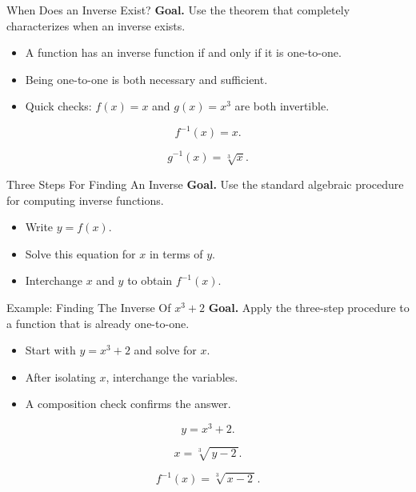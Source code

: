 \documentclass[aspectratio=169]{beamer}
\begin{document}
\begin{frame}[t]{When Does an Inverse Exist?}
\textbf{Goal.} Use the theorem that completely characterizes when an inverse exists.

\begin{itemize}
  \item A function has an inverse function if and only if it is one-to-one.
  \item Being one-to-one is both necessary and sufficient.
  \item Quick checks: \(f(x)=x\) and \(g(x)=x^3\) are both invertible.
\end{itemize}

\[
    f^{-1}(x)=x.
    \]

\[
    g^{-1}(x)=\sqrt[3]{x}.
    \]
\end{frame}

\begin{frame}[t]{Three Steps For Finding An Inverse}
\textbf{Goal.} Use the standard algebraic procedure for computing inverse functions.

\begin{itemize}
  \item Write \(y=f(x)\).
  \item Solve this equation for \(x\) in terms of \(y\).
  \item Interchange \(x\) and \(y\) to obtain \(f^{-1}(x)\).
\end{itemize}
\end{frame}

\begin{frame}[t]{Example: Finding The Inverse Of \(x^3+2\)}
\textbf{Goal.} Apply the three-step procedure to a function that is already one-to-one.

\begin{itemize}
  \item Start with \(y=x^3+2\) and solve for \(x\).
  \item After isolating \(x\), interchange the variables.
  \item A composition check confirms the answer.
\end{itemize}

\[
y=x^3+2.
\]

\[
x=\sqrt[3]{\,y-2\,}.
\]

\[
f^{-1}(x)=\sqrt[3]{\,x-2\,}.
\]
\end{frame}
\end{document}
